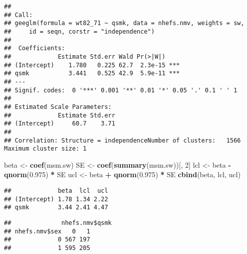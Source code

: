 \documentclass[10pt,]{book}
\newenvironment{Shaded}{\begin{snugshade}}{\end{snugshade}}
\newcommand{\CommentTok}[1]{\textcolor[rgb]{0.56,0.35,0.01}{\textit{#1}}}
\newcommand{\DecValTok}[1]{\textcolor[rgb]{0.00,0.00,0.81}{#1}}
\newcommand{\FloatTok}[1]{\textcolor[rgb]{0.00,0.00,0.81}{#1}}
\newcommand{\KeywordTok}[1]{\textcolor[rgb]{0.13,0.29,0.53}{\textbf{#1}}}
\newcommand{\NormalTok}[1]{#1}
\newcommand{\OperatorTok}[1]{\textcolor[rgb]{0.81,0.36,0.00}{\textbf{#1}}}
\newcommand{\StringTok}[1]{\textcolor[rgb]{0.31,0.60,0.02}{#1}}
\begin{document}
\begin{verbatim}
## 
## Call:
## geeglm(formula = wt82_71 ~ qsmk, data = nhefs.nmv, weights = sw, 
##     id = seqn, corstr = "independence")
## 
##  Coefficients:
##             Estimate Std.err Wald Pr(>|W|)    
## (Intercept)    1.780   0.225 62.7  2.3e-15 ***
## qsmk           3.441   0.525 42.9  5.9e-11 ***
## ---
## Signif. codes:  0 '***' 0.001 '**' 0.01 '*' 0.05 '.' 0.1 ' ' 1
## 
## Estimated Scale Parameters:
##             Estimate Std.err
## (Intercept)     60.7    3.71
## 
## Correlation: Structure = independenceNumber of clusters:   1566   Maximum cluster size: 1
\end{verbatim}

\begin{Shaded}
\begin{Highlighting}[]
\NormalTok{beta <-}\StringTok{ }\KeywordTok{coef}\NormalTok{(msm.sw)}
\NormalTok{SE <-}\StringTok{ }\KeywordTok{coef}\NormalTok{(}\KeywordTok{summary}\NormalTok{(msm.sw))[, }\DecValTok{2}\NormalTok{]}
\NormalTok{lcl <-}\StringTok{ }\NormalTok{beta }\OperatorTok{-}\StringTok{ }\KeywordTok{qnorm}\NormalTok{(}\FloatTok{0.975}\NormalTok{) }\OperatorTok{*}\StringTok{ }\NormalTok{SE}
\NormalTok{ucl <-}\StringTok{ }\NormalTok{beta }\OperatorTok{+}\StringTok{ }\KeywordTok{qnorm}\NormalTok{(}\FloatTok{0.975}\NormalTok{) }\OperatorTok{*}\StringTok{ }\NormalTok{SE}
\KeywordTok{cbind}\NormalTok{(beta, lcl, ucl)}
\end{Highlighting}
\end{Shaded}

\begin{verbatim}
##             beta  lcl  ucl
## (Intercept) 1.78 1.34 2.22
## qsmk        3.44 2.41 4.47
\end{verbatim}

\begin{Shaded}
\end{Shaded}

\begin{verbatim}
##              nhefs.nmv$qsmk
## nhefs.nmv$sex   0   1
##             0 567 197
##             1 595 205
\end{verbatim}
\end{document}
